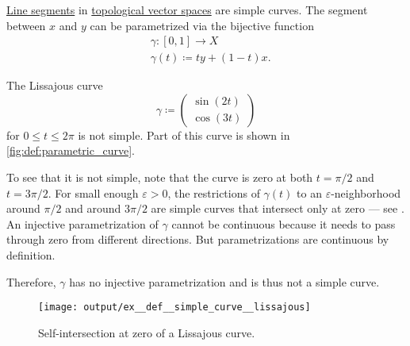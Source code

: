\begin{example}\label{ex:def:simple_curve}
  \hfill
  \begin{thmenum}
     \hyperref[def:line_segment]{Line segments} in \hyperref[def:topological_vector_space]{topological vector spaces} are simple curves. The segment between \( x \) and \( y \) can be parametrized via the bijective function
    \begin{equation*}
      \begin{aligned}
        &\gamma: [0, 1] \to X \\
        &\gamma(t) \coloneqq ty + (1 - t)x.
      \end{aligned}
    \end{equation*}

     The Lissajous curve
    \begin{equation*}
      \gamma \coloneqq \begin{pmatrix} \sin(2t) \\ \cos(3t) \end{pmatrix}
    \end{equation*}
    for \( 0 \leq t \leq 2\pi \) is not simple. Part of this curve is shown in \cref{fig:def:parametric_curve}.

    To see that it is not simple, note that the curve is zero at both \( t = \pi / 2 \) and \( t = 3\pi / 2 \). For small enough \( \varepsilon > 0 \), the restrictions of \( \gamma(t) \) to an \( \varepsilon \)-neighborhood around \( \pi / 2 \) and around \( 3\pi / 2 \) are simple curves that intersect only at zero --- see . An injective parametrization of \( \gamma \) cannot be continuous because it needs to pass through zero from different directions. But parametrizations are continuous by definition.

    Therefore, \( \gamma \) has no injective parametrization and is thus not a simple curve.

    \begin{figure}[!ht]
      \centering
      \texttt{[image: output/ex\_\_def\_\_simple\_curve\_\_lissajous]}
      \caption{Self-intersection at zero of a Lissajous curve.}\label{fig:ex:def:simple_curve/lissajous}
    \end{figure}
  \end{thmenum}
\end{example}

